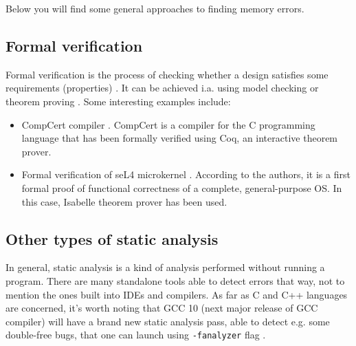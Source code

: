 \documentclass[shortabstract, manyadvisors, english, mgr]{iithesis}
\theoremstyle{definition} \newtheorem*{definition}{Definicja}
\theoremstyle{definition} \newtheorem*{example}{Przykład}
\theoremstyle{definition} \newtheorem*{remark}{Uwaga}
\begin{document}
Below you will find some general approaches to finding memory errors.

\subsection{Formal verification}
Formal verification is the process of checking whether a design satisfies some requirements (properties) \cite{bib:formal-verification-1}. It can be achieved i.a. using model checking or theorem proving \cite{bib:formal-verification-2}. Some interesting examples include:
\begin{itemize}
    \item CompCert compiler \cite{bib:compcert}. CompCert is a compiler for the C programming language that has been formally verified using Coq, an interactive theorem prover.
    \item Formal verification of seL4 microkernel \cite{bib:seL4}. According to the authors, it is a first formal proof of functional correctness of a complete, general-purpose OS. In this case, Isabelle theorem prover has been used.
\end{itemize}
\subsection{Other types of static analysis}
In general, static analysis is a kind of analysis performed without running a program. There are many standalone tools able to detect errors that way, not to mention the ones built into IDEs and compilers. As far as C and C++ languages are concerned, it's worth noting that GCC 10 (next major release of GCC compiler) will have a brand new static analysis pass, able to detect e.g. some double-free bugs, that one can launch using \texttt{-fanalyzer} flag \cite{bib:gcc-10}.
\end{document}
